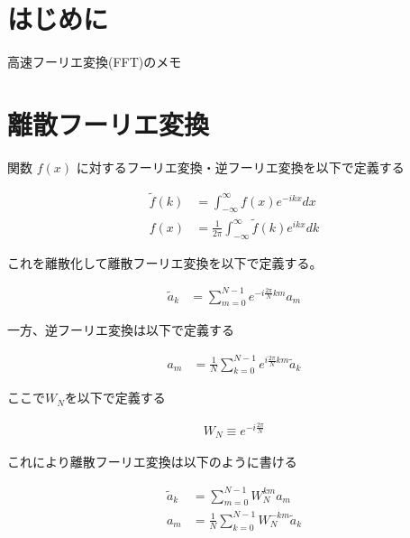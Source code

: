 \section{はじめに}

高速フーリエ変換(FFT)のメモ

\section{離散フーリエ変換}

関数 $f(x)$ に対するフーリエ変換・逆フーリエ変換を以下で定義する

\begin{align}
    \tilde{f}(k) &= \int_{-\infty}^{\infty} f(x)e^{-ikx} dx \\
    f(x) &= \frac{1}{2\pi} \int_{-\infty}^{\infty} \tilde{f}(k) e^{ikx} dk
\end{align}

これを離散化して離散フーリエ変換を以下で定義する。

\begin{align}
    \tilde{a}_k &= \sum_{m = 0}^{N - 1} e^{-i\frac{2\pi}{N} km} a_m
\end{align}

一方、逆フーリエ変換は以下で定義する

\begin{align}
    a_m &= \frac{1}{N}\sum_{k = 0}^{N - 1} e^{i\frac{2\pi}{N} km} \tilde{a}_k
\end{align}

ここで$W_N$を以下で定義する

\begin{align}
    W_N \equiv e^{-i\frac{2\pi}{N}}
\end{align}

これにより離散フーリエ変換は以下のように書ける

\begin{align}
\tilde{a}_k &= \sum_{m = 0}^{N - 1} W_N^{km} a_m \\
    a_m &= \frac{1}{N}\sum_{k = 0}^{N - 1} W_N^{-km} \tilde{a}_k
\end{align}
